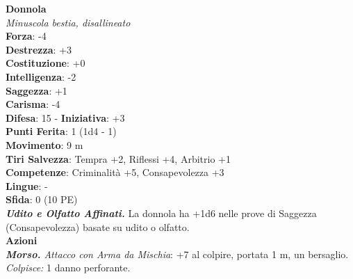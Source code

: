 \begin{multicols}{2}
\medskip\textbf{Donnola}\\
\emph{Minuscola bestia, disallineato}\\
\textbf{Forza}: -4\\
\textbf{Destrezza}: +3\\
\textbf{Costituzione}: +0\\
\textbf{Intelligenza}: -2\\
\textbf{Saggezza}: +1\\
\textbf{Carisma}: -4\\
\textbf{Difesa}: 15 - \textbf{Iniziativa}: +3\\
\textbf{Punti Ferita}: 1 (1d4 - 1)\\
\textbf{Movimento}: 9 m\\
\textbf{Tiri Salvezza}: Tempra +2, Riflessi +4, Arbitrio +1\\
\textbf{Competenze}: Criminalità +5, Consapevolezza +3\\
\textbf{Lingue}: -\\
\textbf{Sfida}: 0 (10 PE)\smallskip\\
\emph{\textbf{Udito e Olfatto Affinati.}} La donnola ha +1d6 nelle prove di Saggezza (Consapevolezza) basate su udito o olfatto.\\
\smallskip\textbf{Azioni}\\
\emph{\textbf{Morso.} Attacco con Arma da Mischia}: +7 al colpire, portata 1 m, un bersaglio.\\
\emph{Colpisce:} 1 danno perforante.\\



\end{multicols}
